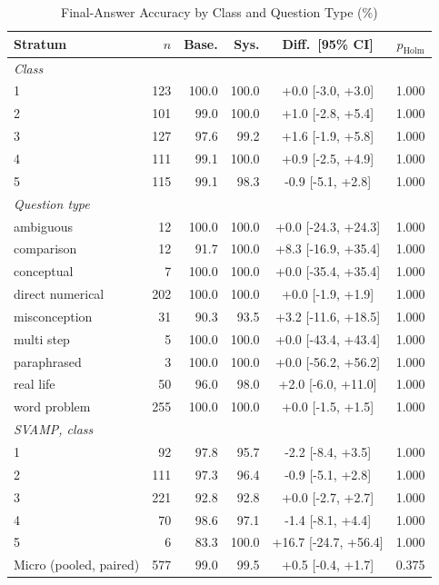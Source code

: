 \begin{table}[t]
\centering
\caption{Final-Answer Accuracy by Class and Question Type (\%)}
\label{tab:acc-breakdown}
\footnotesize
\begin{tabular}{@{}L{3.2cm}rrrcr@{}}
\toprule
Stratum & $n$ & Base. & Sys. & Diff.\ [95\% CI] & $p_{\mathrm{Holm}}$ \\
\midrule
\textit{Class} &  &  &  &  &  \\
1 & 123 & 100.0 & 100.0 & +0.0 [-3.0, +3.0] & 1.000 \\
2 & 101 & 99.0 & 100.0 & +1.0 [-2.8, +5.4] & 1.000 \\
3 & 127 & 97.6 & 99.2 & +1.6 [-1.9, +5.8] & 1.000 \\
4 & 111 & 99.1 & 100.0 & +0.9 [-2.5, +4.9] & 1.000 \\
5 & 115 & 99.1 & 98.3 & -0.9 [-5.1, +2.8] & 1.000 \\
\midrule
\textit{Question type} &  &  &  &  &  \\
ambiguous & 12 & 100.0 & 100.0 & +0.0 [-24.3, +24.3] & 1.000 \\
comparison & 12 & 91.7 & 100.0 & +8.3 [-16.9, +35.4] & 1.000 \\
conceptual & 7 & 100.0 & 100.0 & +0.0 [-35.4, +35.4] & 1.000 \\
direct numerical & 202 & 100.0 & 100.0 & +0.0 [-1.9, +1.9] & 1.000 \\
misconception & 31 & 90.3 & 93.5 & +3.2 [-11.6, +18.5] & 1.000 \\
multi step & 5 & 100.0 & 100.0 & +0.0 [-43.4, +43.4] & 1.000 \\
paraphrased & 3 & 100.0 & 100.0 & +0.0 [-56.2, +56.2] & 1.000 \\
real life & 50 & 96.0 & 98.0 & +2.0 [-6.0, +11.0] & 1.000 \\
word problem & 255 & 100.0 & 100.0 & +0.0 [-1.5, +1.5] & 1.000 \\
\midrule
\textit{SVAMP, class} &  &  &  &  &  \\
1 & 92 & 97.8 & 95.7 & -2.2 [-8.4, +3.5] & 1.000 \\
2 & 111 & 97.3 & 96.4 & -0.9 [-5.1, +2.8] & 1.000 \\
3 & 221 & 92.8 & 92.8 & +0.0 [-2.7, +2.7] & 1.000 \\
4 & 70 & 98.6 & 97.1 & -1.4 [-8.1, +4.4] & 1.000 \\
5 & 6 & 83.3 & 100.0 & +16.7 [-24.7, +56.4] & 1.000 \\
\midrule
Micro (pooled, paired) & 577 & 99.0 & 99.5 & +0.5 [-0.4, +1.7] & 0.375 \\

\end{tabular}
\end{table}
